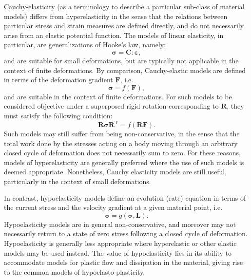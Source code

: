 Cauchy-elasticity (as a terminology to describe a particular sub-class of material models) differs from hyperelasticity in the sense that the relations between particular stress and strain measures are defined directly, and do not necessarily arise from an elastic potential function. The models of linear elasticity, in particular, are generalizations of Hooke's law, namely:
\begin{equation}
  \boldsymbol{\sigma} = \bm{C} \colon \boldsymbol{\varepsilon},
\end{equation}
and are suitable for small deformations, but are typically not applicable in the context of finite deformations. By comparison, Cauchy-elastic models are defined in terms of the deformation gradient $\bm{F}$, i.e.
\begin{equation}
  \boldsymbol{\sigma} = f (\bm{F}),
\end{equation}
and are suitable in the context of finite deformations. For such models to be considered objective under a superposed rigid rotation corresponding to $\bm{R}$, they must satisfy the following condition:
\begin{equation}
  \bm{R} \boldsymbol{\sigma} \bm{R}^{\mathrm T} = f (\bm{R} \bm{F}).
\end{equation}
Such models may still suffer from being non-conservative, in the sense that the total work done by the stresses acting on a body moving through an arbitrary closed cycle of deformation does not necessarily sum to zero. For these reasons, models of hyperelasticity are generally preferred where the use of such models is deemed appropriate. Nonetheless, Cauchy elasticity models are still useful, particularly in the context of small deformations.

In contrast, hypoelasticity models define an evolution (rate) equation in terms of the current stress and the velocity gradient at a given material point, i.e.
\begin{equation}
  \dot{\boldsymbol{\sigma}} = g(\boldsymbol{\sigma}, \bm{L}).
\end{equation}
Hypoelasticity models are in general non-conservative, and moreover may not necessarily return to a state of zero stress following a closed cycle of deformation. Hypoelasticity is generally less appropriate where hyperelastic or other elastic models may be used instead. The value of hypoelasticity lies in its ability to accommodate models for plastic flow and dissipation in the material, giving rise to the common models of hypoelasto-plasticity.

